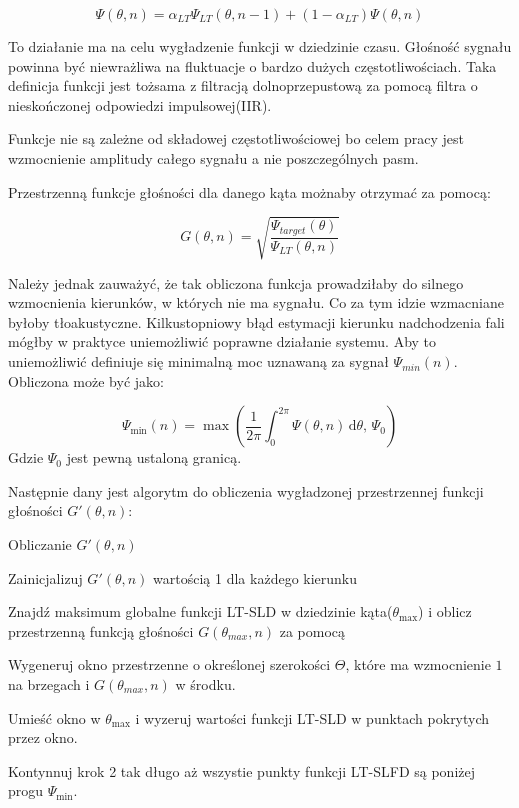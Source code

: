 \begin{equation}
    \label{equation:LT_SLD}
    \Psi(\theta,n)=
    \alpha_{LT}\Psi_{LT}(\theta,n-1)
    +(1-\alpha_{LT})\Psi(\theta,n)
\end{equation}

\noindent To działanie ma na celu wygładzenie funkcji w dziedzinie czasu. Głośność sygnału powinna być niewrażliwa na fluktuacje o bardzo dużych częstotliwościach. Taka definicja funkcji jest tożsama z filtracją dolnoprzepustową za pomocą filtra o nieskończonej odpowiedzi impulsowej(IIR).

\noindent Funkcje nie są zależne od składowej częstotliwościowej bo celem pracy jest wzmocnienie amplitudy całego sygnału a nie poszczególnych pasm.

\noindent Przestrzenną funkcje głośności dla danego kąta możnaby otrzymać za pomocą:

\begin{equation}
    \label{equation:sqrt}
    G(\theta,n)=
    \sqrt{\dfrac{\Psi_{target}(\theta)}{
    \Psi_{LT}(\theta,n)}}
\end{equation}

\noindent Należy jednak zauważyć, że tak obliczona funkcja prowadziłaby do silnego wzmocnienia kierunków, w których nie ma sygnału. Co za tym idzie wzmacniane byłoby tłoakustyczne. Kilkustopniowy błąd estymacji kierunku nadchodzenia fali mógłby w praktyce uniemożliwić poprawne działanie systemu. Aby to uniemożliwić definiuje się minimalną moc uznawaną za sygnał $\Psi_{min}(n)$. Obliczona może być jako:

\begin{equation}
    \Psi_{\min}(n)=
    \max({\dfrac{1}{2\pi} \int_{0}^{2\pi} \Psi(\theta,n) \, \mathrm{d}\theta, \, \Psi_{0}})
\end{equation}
Gdzie $\Psi_{0}$ jest pewną ustaloną granicą.

\newpage

\noindent Następnie  dany jest algorytm do obliczenia wygładzonej przestrzennej funkcji głośności $G'(\theta,n)$:


\begin{algorithm}
  
  \caption{Obliczanie $G'(\theta,n)$}
  \begin{algorithmic}[1]
    \State Zainicjalizuj $G'(\theta,n)$ wartością 1 dla każdego kierunku
    
    \State  Znajdź maksimum globalne funkcji LT-SLD w dziedzinie kąta($\theta_{\max}$) i oblicz przestrzenną funkcją głośności $G(\theta_{max},n)$ za pomocą
    
    \State Wygeneruj okno przestrzenne o określonej szerokości $\Theta$, które ma wzmocnienie $1$ na brzegach i $G(\theta_{max},n)$ w środku.
    
    \State Umieść okno w $\theta_{\max}$ i wyzeruj wartości funkcji LT-SLD w punktach pokrytych przez okno.
    
    \State Kontynnuj krok 2 tak długo aż wszystie punkty funkcji LT-SLFD są poniżej progu $\Psi_{\min}$.
  \end{algorithmic}
\end{algorithm}

